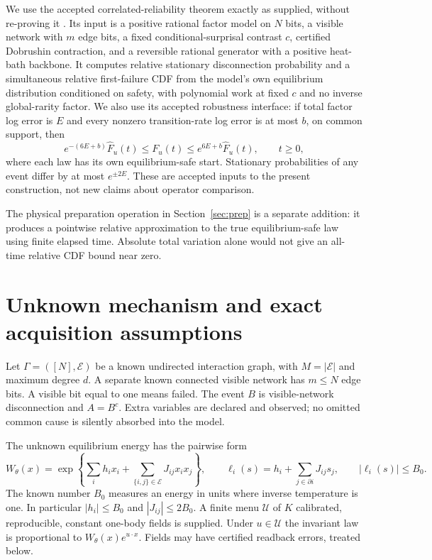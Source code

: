 \documentclass[11pt]{article}
\newcommand{\calE}{\mathcal E}
\newcommand{\calU}{\mathcal U}
\begin{document}
We use the accepted correlated-reliability theorem exactly as supplied, without re-proving it \cite{accepted,prior}. Its input is a positive rational factor model on $N$ bits, a visible network with $m$ edge bits, a fixed conditional-surprisal contrast $c$, certified Dobrushin contraction, and a reversible rational generator with a positive heat-bath backbone. It computes relative stationary disconnection probability and a simultaneous relative first-failure CDF from the model's own equilibrium distribution conditioned on safety, with polynomial work at fixed $c$ and no inverse global-rarity factor. We also use its accepted robustness interface: if total factor log error is $E$ and every nonzero transition-rate log error is at most $b$, on common support, then
\begin{equation}
 e^{-(6E+b)}\widehat F_u(t)\le F_u(t)\le e^{6E+b}\widehat F_u(t),\qquad t\ge0,
 \label{eq:inherited}
\end{equation}
where each law has its own equilibrium-safe start. Stationary probabilities of any event differ by at most $e^{\pm2E}$. These are accepted inputs to the present construction, not new claims about operator comparison.

The physical preparation operation in Section~\ref{sec:prep} is a separate addition: it produces a pointwise relative approximation to the true equilibrium-safe law using finite elapsed time. Absolute total variation alone would not give an all-time relative CDF bound near zero.

\section{Unknown mechanism and exact acquisition assumptions}
\label{sec:access}
Let $\Gamma=([N],\calE)$ be a known undirected interaction graph, with $M=|\calE|$ and maximum degree $d$. A separate known connected visible network has $m\le N$ edge bits. A visible bit equal to one means failed. The event $B$ is visible-network disconnection and $A=B^c$. Extra variables are declared and observed; no omitted common cause is silently absorbed into the model.

The unknown equilibrium energy has the pairwise form
\begin{equation}
 W_\theta(x)=\exp\left\{\sum_i h_ix_i+\sum_{\{i,j\}\in\calE}J_{ij}x_ix_j\right\},\qquad
 \ell_i(s)=h_i+\sum_{j\in\partial i}J_{ij}s_j,\qquad |\ell_i(s)|\le B_0.
 \label{eq:model}
\end{equation}
The known number $B_0$ measures an energy in units where inverse temperature is one. In particular $|h_i|\le B_0$ and $|J_{ij}|\le2B_0$. A finite menu $\calU$ of $K$ calibrated, reproducible, constant one-body fields is supplied. Under $u\in\calU$ the invariant law is proportional to $W_\theta(x)e^{u\cdot x}$. Fields may have certified readback errors, treated below.
\end{document}
